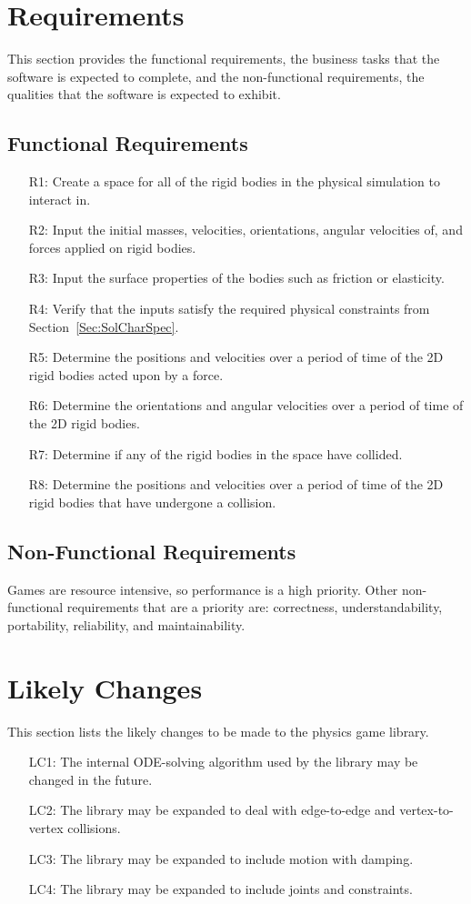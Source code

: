 \documentclass[12pt]{article}
\begin{document}
\section{Requirements}
\label{Sec:Requirements}
This section provides the functional requirements, the business tasks that the software is expected to complete, and the non-functional requirements, the qualities that the software is expected to exhibit.
\subsection{Functional Requirements}
\label{Sec:FRs}
\begin{itemize}
\item[R1:]Create a space for all of the rigid bodies in the physical simulation to interact in.
\item[R2:]Input the initial masses, velocities, orientations, angular velocities of, and forces applied on rigid bodies.
\item[R3:]Input the surface properties of the bodies such as friction or elasticity.
\item[R4:]Verify that the inputs satisfy the required physical constraints from Section~\ref{Sec:SolCharSpec}.
\item[R5:]Determine the positions and velocities over a period of time of the 2D rigid bodies acted upon by a force.
\item[R6:]Determine the orientations and angular velocities over a period of time of the 2D rigid bodies.
\item[R7:]Determine if any of the rigid bodies in the space have collided.
\item[R8:]Determine the positions and velocities over a period of time of the 2D rigid bodies that have undergone a collision.
\end{itemize}
\subsection{Non-Functional Requirements}
\label{Sec:NFRs}
Games are resource intensive, so performance is a high priority. Other non-functional requirements that are a priority are: correctness, understandability, portability, reliability, and maintainability.
\section{Likely Changes}
\label{Sec:LCs}
This section lists the likely changes to be made to the physics game library.
\begin{itemize}
\item[LC1:]The internal ODE-solving algorithm used by the library may be changed in the future.
\item[LC2:]The library may be expanded to deal with edge-to-edge and vertex-to-vertex collisions.
\item[LC3:]The library may be expanded to include motion with damping.
\item[LC4:]The library may be expanded to include joints and constraints.
\end{itemize}
\end{document}
